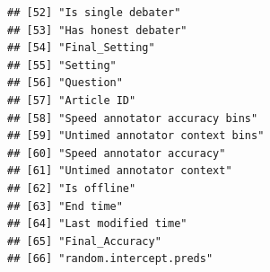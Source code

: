 \documentclass[
]{article}
\newenvironment{Shaded}{\begin{snugshade}}{\end{snugshade}}
\newcommand{\AttributeTok}[1]{\textcolor[rgb]{0.77,0.63,0.00}{#1}}
\newcommand{\FunctionTok}[1]{\textcolor[rgb]{0.00,0.00,0.00}{#1}}
\newcommand{\NormalTok}[1]{#1}
\newcommand{\OtherTok}[1]{\textcolor[rgb]{0.56,0.35,0.01}{#1}}
\newcommand{\SpecialCharTok}[1]{\textcolor[rgb]{0.00,0.00,0.00}{#1}}
\newcommand{\StringTok}[1]{\textcolor[rgb]{0.31,0.60,0.02}{#1}}
\begin{document}
\begin{verbatim}
## [52] "Is single debater"                      
## [53] "Has honest debater"                     
## [54] "Final_Setting"                          
## [55] "Setting"                                
## [56] "Question"                               
## [57] "Article ID"                             
## [58] "Speed annotator accuracy bins"          
## [59] "Untimed annotator context bins"         
## [60] "Speed annotator accuracy"               
## [61] "Untimed annotator context"              
## [62] "Is offline"                             
## [63] "End time"                               
## [64] "Last modified time"                     
## [65] "Final_Accuracy"                         
## [66] "random.intercept.preds"
\end{verbatim}

\begin{Shaded}
\end{Shaded}
\end{document}
